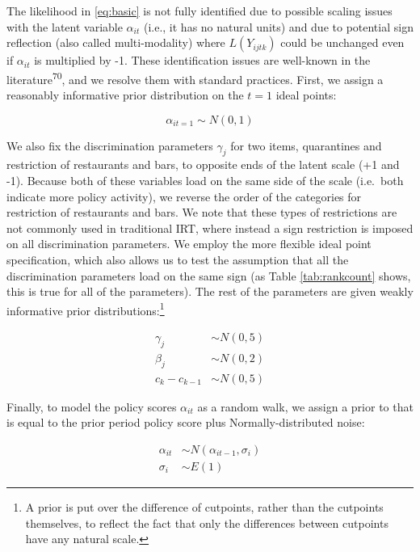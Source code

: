 \documentclass[]{article}
\let\rmarkdownfootnote\footnote%
\def\footnote{\protect\rmarkdownfootnote}
\begin{document}
The likelihood in \eqref{eq:basic} is not fully identified due to possible scaling issues with the latent variable \(\alpha_{it}\) (i.e., it has no natural units) and due to potential sign reflection (also called multi-modality) where \(L(Y_{ijtk})\) could be unchanged even if \(\alpha_{it}\) is multiplied by -1. These identification issues are well-known in the literature\textsuperscript{70}, and we resolve them with standard practices. First, we assign a reasonably informative prior distribution on the \(t=1\) ideal points:

\begin{equation}
\alpha_{it=1} \sim N(0,1)
\label{eq:id1}
\end{equation}

We also fix the discrimination parameters \(\gamma_j\) for two items, quarantines and restriction of restaurants and bars, to opposite ends of the latent scale (+1 and -1). Because both of these variables load on the same side of the scale (i.e.~both indicate more policy activity), we reverse the order of the categories for restriction of restaurants and bars. We note that these types of restrictions are not commonly used in traditional IRT, where instead a sign restriction is imposed on all discrimination parameters. We employ the more flexible ideal point specification, which also allows us to test the assumption that all the discrimination parameters load on the same sign (as Table \ref{tab:rankcount} shows, this is true for all of the parameters). The rest of the parameters are given weakly informative prior distributions:\footnote{A prior is put over the difference of cutpoints, rather than the cutpoints themselves, to reflect the fact that only the differences between cutpoints have any natural scale.}

\begin{align}
\gamma_j &\sim N(0,5)\\
\beta_j &\sim N(0,2)\\
c_k - c_{k-1} &\sim N(0,5)
\label{eq:id2}
\end{align}

Finally, to model the policy scores \(\alpha_{it}\) as a random walk, we assign a prior to that is equal to the prior period policy score plus Normally-distributed noise:

\begin{align}
\alpha_{it} &\sim N(\alpha_{it-1},\sigma_i)\\
\sigma_i &\sim E(1)
\label{eq:rwc}
\end{align}
\end{document}
